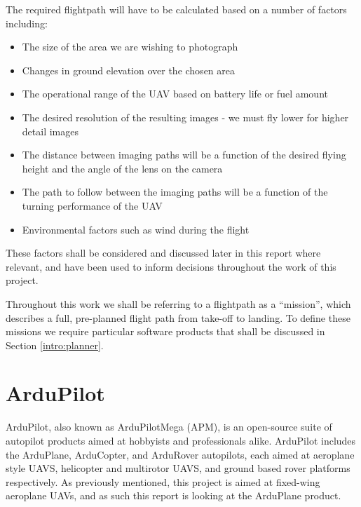 The required flightpath will have to be calculated based on a number of factors including:
\begin{itemize}
	\item The size of the area we are wishing to photograph
	\item Changes in ground elevation over the chosen area
	\item The operational range of the UAV based on battery life or fuel amount
	\item The desired resolution of the resulting images - we must fly lower for higher detail images
	\item The distance between imaging paths will be a function of the desired flying height and the angle of the lens on the camera
	\item The path to follow between the imaging paths will be a function of the turning performance of the UAV
	\item Environmental factors such as wind during the flight
\end{itemize}

These factors shall be considered and discussed later in this report where relevant, and have been used to inform decisions throughout the work of this project.

Throughout this work we shall be referring to a flightpath as a ``mission'', which describes a full, pre-planned flight path from take-off to landing. To define these missions we require particular software products that shall be discussed in Section \ref{intro:planner}.




\section{ArduPilot} 
\label{intro:ardupilot}

ArduPilot, also known as ArduPilotMega (APM), is an open-source suite of autopilot products aimed at hobbyists and professionals alike. ArduPilot includes the ArduPlane, ArduCopter, and ArduRover autopilots, each aimed at aeroplane style UAVS, helicopter and multirotor UAVS, and ground based rover platforms respectively. As previously mentioned, this project is aimed at fixed-wing aeroplane UAVs, and as such this report is looking at the ArduPlane product. 

